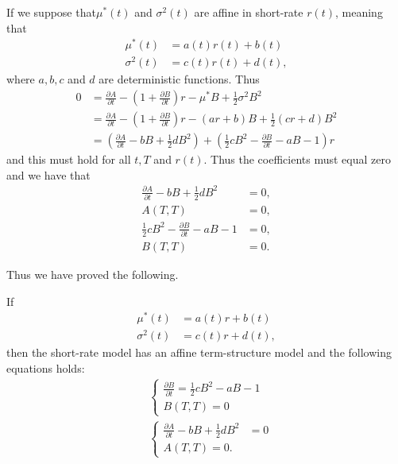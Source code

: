 If we suppose that$\mu^*(t)$ and $\sigma^2(t)$ are affine in short-rate $r(t)$, meaning that
\begin{align}
\mu^*(t) &= a(t)r(t) + b(t) \\
\sigma^2(t) &= c(t)r(t) + d(t),
\end{align}
where $a,b,c$ and $d$ are deterministic functions. Thus
\begin{align}
0 	&= \frac{\partial A}{\partial t} - ( 1 + \frac{\partial B}{\partial t} ) r - \mu^* B + \frac{1}{2} \sigma^2 B^2 \\
&= \frac{\partial A}{\partial t} - ( 1 + \frac{\partial B}{\partial t} ) r - \left( ar+b \right) B + \frac{1}{2} \left( cr+d \right) B^2 \\
&= \left( \frac{\partial A}{\partial t} - bB + \frac{1}{2} d B^2 \right) +
\left( \frac{1}{2} cB^2 - \frac{\partial B}{\partial t} -aB - 1 \right) r
\end{align}
and this must hold for all $t, T$ and $r(t)$. Thus the coefficients must equal zero and we have that
\begin{align}
\frac{\partial A}{\partial t} - bB + \frac{1}{2} d B^2 &= 0, \\
A(T,T) &= 0, \\
\frac{1}{2} cB^2 - \frac{\partial B}{\partial t} -aB - 1 &= 0, \\
B(T,T) &= 0 .
\end{align}

Thus we have proved the following.

\begin{thm}
	\label{affineconfition}
	If 
	\begin{align}
	\mu^*(t) &= a(t) r + b(t) \\
	\sigma^2(t) &= c(t) r + d(t),
	\end{align}
	then the short-rate model has an affine term-structure model and the following equations holds:
	\begin{align}
	&\begin{cases}
	\frac{\partial B}{\partial t} = \frac{1}{2} c B^2  -a B - 1 \\
	B(T,T) = 0
	\end{cases} \\
	&\begin{cases}    
	\frac{\partial A}{\partial t} - bB + \frac{1}{2} d B^2 &= 0 \\
	A(T,T) = 0 .
	\end{cases}
	\end{align}
\end{thm}

